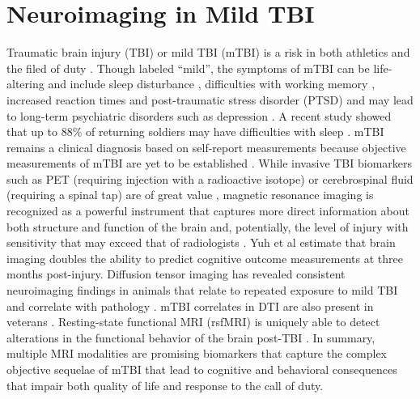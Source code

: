 \documentclass[preprint,1p,times]{elsarticle}
\begin{document}
\section{Neuroimaging in Mild TBI}
Traumatic brain injury (TBI) or mild TBI (mTBI) is a risk in both athletics and the
filed of duty
\cite{McCrea2008,Toblin2012,Peskind2013,Small2013,Kontos2013,Gosselin2012,Zuckerman2012}.
Though labeled ``mild'', the symptoms of mTBI can be life-altering and
include sleep disturbance \cite{Mysliwiec2013}, difficulties with
working memory \cite{Bryer2013}, increased reaction times
\cite{Luethcke2011} and post-traumatic stress disorder (PTSD)
\cite{Toblin2012,Bazarian2013} and may
lead to long-term psychiatric disorders such as depression \cite{Mayer2011,Rapp2012}.  A recent study showed that up
to 88\% of returning soldiers may have difficulties with sleep
\cite{Mysliwiec2013}.  %
mTBI remains a clinical diagnosis \cite{MacDonald2011} based on self-report measurements
because objective measurements of mTBI are yet to be established \cite{Rapp2012}.
While invasive TBI biomarkers such as PET (requiring injection with a
radioactive isotope) \cite{Small2013} or cerebrospinal fluid (requiring a spinal tap)
are of great value \cite{Zetterberg2013}, magnetic resonance imaging
is recognized as a powerful instrument that captures more direct
information about both structure and function of the brain and,
potentially, the level of injury with sensitivity that may exceed that
of radiologists \cite{Fox2013,Ross2013}.  Yuh et al \cite{Yuh2013}
estimate that brain imaging doubles the ability to predict cognitive
outcome measurements at three months post-injury.  Diffusion tensor
imaging has revealed consistent neuroimaging findings in animals that
relate to repeated exposure to mild TBI and correlate with pathology
\cite{Bennett2012}.  mTBI correlates in DTI are also present in veterans
\cite{Morey2012,Jorge2013}.  Resting-state functional MRI (rsfMRI) is uniquely able to detect alterations in
the functional behavior of the brain post-TBI \cite{Mayer2011,Scheibel2012,Stevens2012}.
In summary, multiple MRI modalities are promising biomarkers that 
capture the complex objective sequelae of mTBI that lead to cognitive and behavioral consequences
that impair both quality of life and response to the call of duty. 
\end{document}

